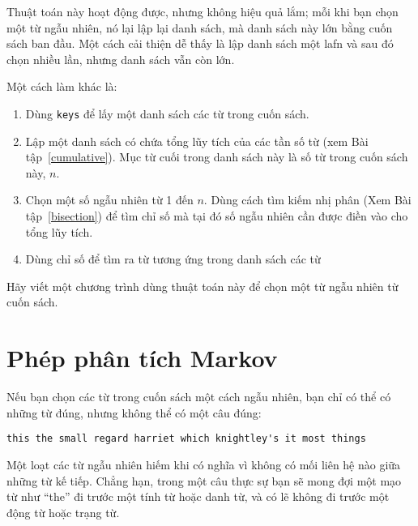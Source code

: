 \documentclass[11pt]{book}
\begin{document}
\begin{ex}
\label{randhist}


Thuật toán này hoạt động được, nhưng không hiệu quả lắm; mỗi khi
bạn chọn một từ ngẫu nhiên, nó lại lập lại danh sách, mà danh sách 
này lớn bằng cuốn sách ban đầu. Một cách cải thiện dễ thấy là lập
danh sách một lafn và sau đó chọn nhiều lần, nhưng danh sách vẫn
còn lớn.

Một cách làm khác là:

\begin{enumerate}

\item Dùng {\tt keys} để lấy một danh sách các từ trong cuốn sách.

\item Lập một danh sách có chứa tổng lũy tích của các tần số từ 
  (xem Bài tập~\ref{cumulative}).  Mục từ cuối 
  trong danh sách này là số từ trong cuốn sách này, $n$.
  
\item Chọn một số ngẫu nhiên từ 1 đến $n$.  Dùng cách tìm kiếm nhị phân
  (Xem Bài tập~\ref{bisection}) để tìm chỉ số mà tại đó số ngẫu nhiên cần
  được điền vào cho tổng lũy tích.
  
\item Dùng chỉ số để tìm ra từ tương ứng trong danh sách các từ

\end{enumerate}

Hãy viết một chương trình dùng thuật toán này để chọn một từ ngẫu nhiên
từ cuốn sách.
\end{ex}



\section{Phép phân tích Markov}


Nếu bạn chọn các từ trong cuốn sách một cách ngẫu nhiên, bạn chỉ có thể 
có những từ đúng, nhưng không thể có một câu đúng:

\beforeverb
\begin{verbatim}
this the small regard harriet which knightley's it most things
\end{verbatim}
\afterverb
%
Một loạt các từ ngẫu nhiên hiếm khi có nghĩa vì không có mối liên hệ
nào giữa những từ kế tiếp. Chẳng hạn, trong
một câu thực sự bạn sẽ mong đợi một mạo từ như ``the'' đi trước
một tính từ hoặc danh từ, và có lẽ không đi trước một động từ
hoặc trạng từ.
\end{document}
